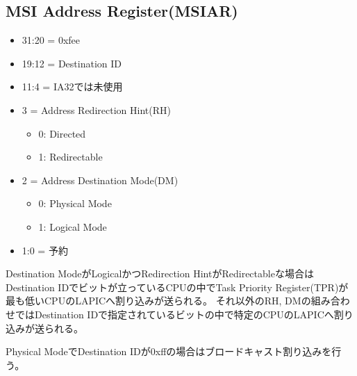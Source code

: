 \subsection{MSI Address Register(MSIAR)}
\begin{itemize}
\item 31:20 = 0xfee
\item 19:12 = Destination ID
\item 11:4 = IA32では未使用
\item 3 = Address Redirection Hint(RH)
\begin{itemize}
\item 0: Directed
\item 1: Redirectable
\end{itemize}
\item 2 = Address Destination Mode(DM)
\begin{itemize}
\item 0: Physical Mode
\item 1: Logical Mode
\end{itemize}
\item 1:0 = 予約
\end{itemize}

Destination ModeがLogicalかつRedirection HintがRedirectableな場合はDestination IDでビットが立っているCPUの中でTask Priority Register(TPR)が最も低いCPUのLAPICへ割り込みが送られる。
それ以外のRH, DMの組み合わせではDestination IDで指定されているビットの中で特定のCPUのLAPICへ割り込みが送られる。

Physical  ModeでDestination IDが0xffの場合はブロードキャスト割り込みを行う。

